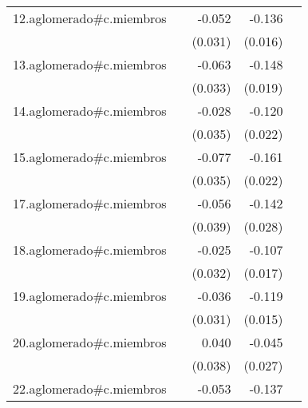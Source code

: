 {\begin{longtable}{l*{4}{D{.}{.}{-1}}}
\addlinespace
12.aglomerado#c.miembros&                     &      -0.052         &      -0.136\sym{***}&                     \\
            &                     &     (0.031)         &     (0.016)         &                     \\
\addlinespace
13.aglomerado#c.miembros&                     &      -0.063         &      -0.148\sym{***}&                     \\
            &                     &     (0.033)         &     (0.019)         &                     \\
\addlinespace
14.aglomerado#c.miembros&                     &      -0.028         &      -0.120\sym{***}&                     \\
            &                     &     (0.035)         &     (0.022)         &                     \\
\addlinespace
15.aglomerado#c.miembros&                     &      -0.077\sym{*}  &      -0.161\sym{***}&                     \\
            &                     &     (0.035)         &     (0.022)         &                     \\
\addlinespace
17.aglomerado#c.miembros&                     &      -0.056         &      -0.142\sym{***}&                     \\
            &                     &     (0.039)         &     (0.028)         &                     \\
\addlinespace
18.aglomerado#c.miembros&                     &      -0.025         &      -0.107\sym{***}&                     \\
            &                     &     (0.032)         &     (0.017)         &                     \\
\addlinespace
19.aglomerado#c.miembros&                     &      -0.036         &      -0.119\sym{***}&                     \\
            &                     &     (0.031)         &     (0.015)         &                     \\
\addlinespace
20.aglomerado#c.miembros&                     &       0.040         &      -0.045         &                     \\
            &                     &     (0.038)         &     (0.027)         &                     \\
\addlinespace
22.aglomerado#c.miembros&                     &      -0.053         &      -0.137\sym{***}&                     \\

\end{longtable}}
